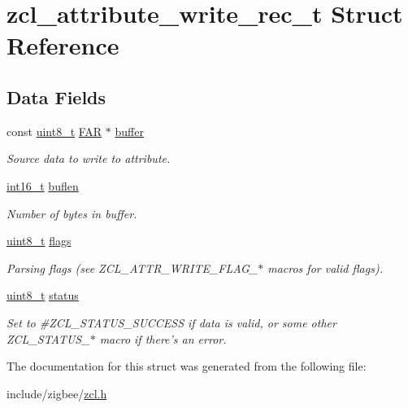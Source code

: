 \hypertarget{structzcl__attribute__write__rec__t}{\section{zcl\-\_\-attribute\-\_\-write\-\_\-rec\-\_\-t Struct Reference}
\label{structzcl__attribute__write__rec__t}
}
\subsection*{Data Fields}
\begin{DoxyCompactItemize}
\item 
\hypertarget{group__zcl_ga669940d05e1abc9807300f7d34169496}{const \hyperlink{group__hal_gae1affc9ca37cfb624959c866a73f83c2}{uint8\-\_\-t} \hyperlink{group__hal_gaef060b3456fdcc093a7210a762d5f2ed}{F\-A\-R} $\ast$ \hyperlink{group__zcl_ga669940d05e1abc9807300f7d34169496}{buffer}}\label{group__zcl_ga669940d05e1abc9807300f7d34169496}

\begin{DoxyCompactList}\small\item\em Source data to write to attribute. \end{DoxyCompactList}\item 
\hypertarget{group__zcl_ga0d88b9a4d20f93d09002c72ef71cf861}{\hyperlink{group__hal_ga2140805d08462d474b82ddc8d1c2f3e6}{int16\-\_\-t} \hyperlink{group__zcl_ga0d88b9a4d20f93d09002c72ef71cf861}{buflen}}\label{group__zcl_ga0d88b9a4d20f93d09002c72ef71cf861}

\begin{DoxyCompactList}\small\item\em Number of bytes in {\ttfamily buffer}. \end{DoxyCompactList}\item 
\hypertarget{group__zcl_gaa2585d779da0ab21273a8d92de9a0ebe}{\hyperlink{group__hal_gae1affc9ca37cfb624959c866a73f83c2}{uint8\-\_\-t} \hyperlink{group__zcl_gaa2585d779da0ab21273a8d92de9a0ebe}{flags}}\label{group__zcl_gaa2585d779da0ab21273a8d92de9a0ebe}

\begin{DoxyCompactList}\small\item\em Parsing flags (see Z\-C\-L\-\_\-\-A\-T\-T\-R\-\_\-\-W\-R\-I\-T\-E\-\_\-\-F\-L\-A\-G\-\_\-$\ast$ macros for valid flags). \end{DoxyCompactList}\item 
\hyperlink{group__hal_gae1affc9ca37cfb624959c866a73f83c2}{uint8\-\_\-t} \hyperlink{group__zcl_gade818037fd6c985038ff29656089758d}{status}
\begin{DoxyCompactList}\small\item\em Set to \#\-Z\-C\-L\-\_\-\-S\-T\-A\-T\-U\-S\-\_\-\-S\-U\-C\-C\-E\-S\-S if data is valid, or some other Z\-C\-L\-\_\-\-S\-T\-A\-T\-U\-S\-\_\-$\ast$ macro if there's an error. \end{DoxyCompactList}\end{DoxyCompactItemize}


The documentation for this struct was generated from the following file\-:\begin{DoxyCompactItemize}
\item 
include/zigbee/\hyperlink{zcl_8h}{zcl.\-h}\end{DoxyCompactItemize}
